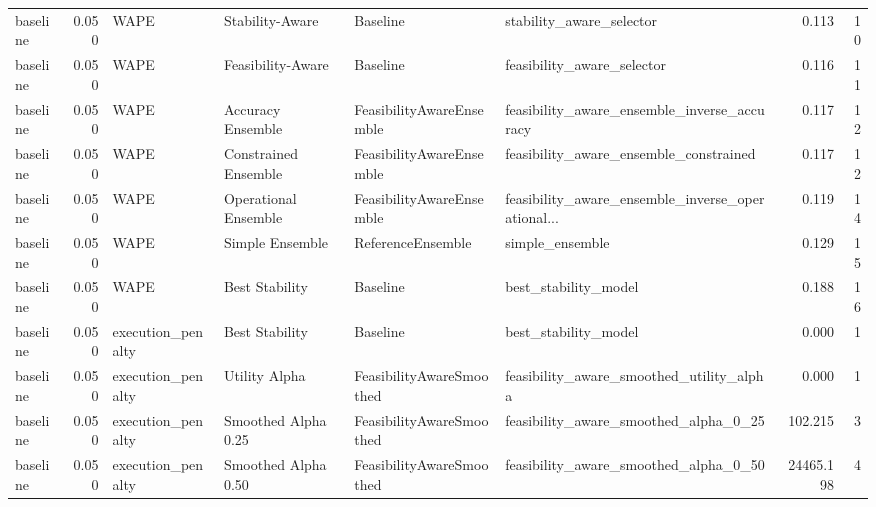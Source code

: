 \begin{table}
{\begin{tabular}{lrllllrr}
      baseline &             0.050 &                        WAPE &       Stability-Aware &                  Baseline &                           stability\_aware\_selector &         0.113 &              10 \\
      baseline &             0.050 &                        WAPE &     Feasibility-Aware &                  Baseline &                         feasibility\_aware\_selector &         0.116 &              11 \\
      baseline &             0.050 &                        WAPE &     Accuracy Ensemble &  FeasibilityAwareEnsemble &        feasibility\_aware\_ensemble\_inverse\_accuracy &         0.117 &              12 \\
      baseline &             0.050 &                        WAPE &  Constrained Ensemble &  FeasibilityAwareEnsemble &             feasibility\_aware\_ensemble\_constrained &         0.117 &              12 \\
      baseline &             0.050 &                        WAPE &  Operational Ensemble &  FeasibilityAwareEnsemble &  feasibility\_aware\_ensemble\_inverse\_operational... &         0.119 &              14 \\
      baseline &             0.050 &                        WAPE &       Simple Ensemble &         ReferenceEnsemble &                                    simple\_ensemble &         0.129 &              15 \\
      baseline &             0.050 &                        WAPE &        Best Stability &                  Baseline &                               best\_stability\_model &         0.188 &              16 \\
      baseline &             0.050 &           execution\_penalty &        Best Stability &                  Baseline &                               best\_stability\_model &         0.000 &               1 \\
      baseline &             0.050 &           execution\_penalty &         Utility Alpha &  FeasibilityAwareSmoothed &           feasibility\_aware\_smoothed\_utility\_alpha &         0.000 &               1 \\
      baseline &             0.050 &           execution\_penalty &   Smoothed Alpha 0.25 &  FeasibilityAwareSmoothed &              feasibility\_aware\_smoothed\_alpha\_0\_25 &       102.215 &               3 \\
      baseline &             0.050 &           execution\_penalty &   Smoothed Alpha 0.50 &  FeasibilityAwareSmoothed &              feasibility\_aware\_smoothed\_alpha\_0\_50 &     24465.198 &               4 \\

\end{tabular}}
\end{table}
